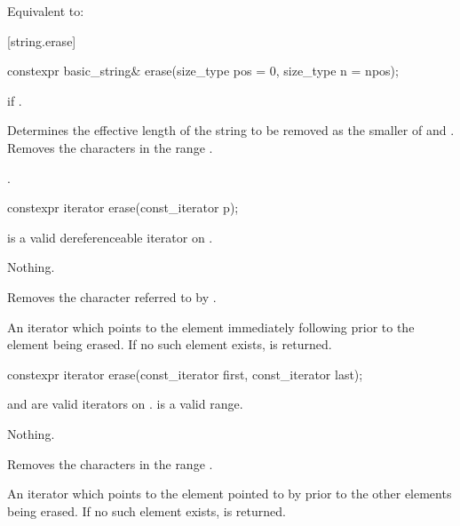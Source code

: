 \begin{itemdescr}
\pnum
\effects
Equivalent to: 
\end{itemdescr}

[string.erase]{}

%
\begin{itemdecl}
constexpr basic_string& erase(size_type pos = 0, size_type n = npos);
\end{itemdecl}

\begin{itemdescr}
\pnum
\throws
{}
if 
.

\pnum
\effects
Determines the effective length 
of the string to be removed as the smaller of  and
.
Removes the characters in the range .

\pnum
\returns
{}.
\end{itemdescr}

%
\begin{itemdecl}
constexpr iterator erase(const_iterator p);
\end{itemdecl}

\begin{itemdescr}
\pnum
\expects
{} is a valid dereferenceable iterator on .

\pnum
\throws
Nothing.

\pnum
\effects
Removes the character referred to by .

\pnum
\returns
An iterator which points to the element immediately following  prior to
the element being erased.
If no such element exists,
is returned.
\end{itemdescr}

%
\begin{itemdecl}
constexpr iterator erase(const_iterator first, const_iterator last);
\end{itemdecl}

\begin{itemdescr}
\pnum
\expects
{} and  are valid iterators on
.  is a valid range.

\pnum
\throws
Nothing.

\pnum
\effects
Removes the characters in the range
\tcode{[first, last)}.

\pnum
\returns
An iterator which points to the element pointed to by  prior to
the other elements being erased.
If no such element exists,
is returned.
\end{itemdescr}

